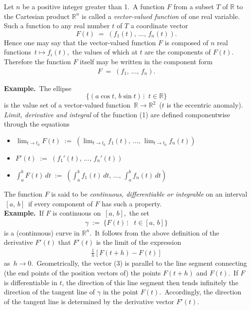 \documentclass[12pt]{article}
\theoremstyle{definition}
\begin{document}
Let $n$ be a positive integer greater than 1.\, A function $F$ from a subset $T$ of $\mathbb{R}$ to the Cartesian product $\mathbb{R}^n$ is called a \emph{vector-valued function} of one real variable.\, Such a function  to any real number $t$ of $T$ a coordinate vector
$$F(t) \;=\; (f_1(t),\,\ldots,\,f_n(t)).$$
Hence one may say that the vector-valued function $F$ is composed of $n$ real functions \,$t \mapsto f_i(t)$,\, the values of which at $t$ are the components of $F(t)$.\, Therefore the function $F$ itself may be written in the component form
\begin{align}
F \;=\; (f_1,\,\ldots,\,f_n).
\end{align}


\textbf{Example.}\, The ellipse
$$\{(a\cos{t},\,b\sin{t})\,\vdots\;\; t \in \mathbb{R}\}$$
is the value set of a vector-valued function\, $\mathbb{R} \to \mathbb{R}^2$\, ($t$ is the eccentric anomaly).\\


\emph{Limit, derivative and integral} of the function (1) are defined componentwise through the equations
\begin{itemize}
\item $\displaystyle\lim_{t\to t_0}F(t) \;:=\; \left(\lim_{t\to t_0}f_1(t),\,\ldots,\,\lim_{t\to t_0}f_n(t)\right)$
\item $\displaystyle F'(t) \;:=\; \left(f_1'(t),\,\ldots,\,f_n'(t)\right)$
\item $\displaystyle\int_a^b\!F(t)\,dt \;:=\; \left(\int_a^b\!f_1(t)\,dt,\,\ldots,\,\int_a^b\!f_n(t)\,dt\right)$
\end{itemize}
The function $F$ is said to be \emph{continuous, differentiable or integrable} on an interval \,$[a,\,b]$\, if every component of $F$ has such a property.\\

\textbf{Example.}\, If $F$ is continuous on \,$[a,\,b]$,\, the set
\begin{align}
\gamma \;:=\; \{F(t)\,\vdots\;\;\; t \in [a,\,b]\}
\end{align}
is a (continuous) curve in $\mathbb{R}^n$.\, It follows from the above definition of the derivative $F'(t)$ that $F'(t)$ is the limit of the expression
\begin{align}
\frac{1}{h}[F(t\!+\!h)-F(t)]
\end{align}
as\, $h \to 0$.\, Geometrically, the vector (3) is parallel to the line segment connecting (the end points of the position vectors of) the points $F(t\!+\!h)$ and $F(t)$.\, If $F$ is differentiable in $t$, the direction of this line segment then tends infinitely the direction of the tangent line of $\gamma$ in the point $F(t)$.\, Accordingly, the direction of the tangent line is determined by the derivative vector $F'(t)$.

\end{document}

